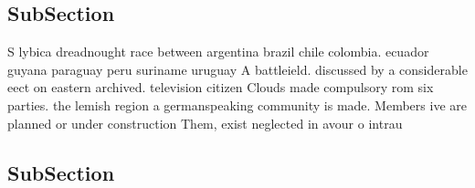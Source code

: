 \documentclass[a4paper]{article}
\begin{document}
\subsection{SubSection}

S lybica dreadnought race between argentina brazil chile colombia. ecuador guyana paraguay peru suriname uruguay A battleield. discussed by a considerable eect on eastern archived. television citizen Clouds made compulsory rom six parties. the lemish region a germanspeaking community is made. Members ive are planned or under construction Them, exist neglected in avour o intrau

\subsection{SubSection}
\end{document}
